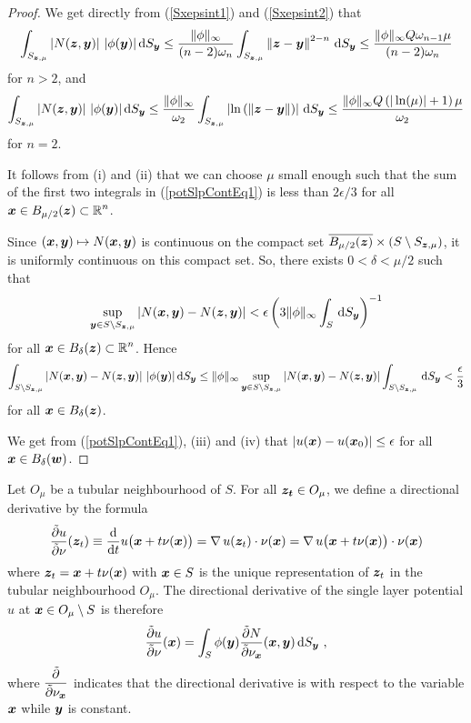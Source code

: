 \begin{proof}
 We get directly from (\ref{Sxepsint1}) and
(\ref{Sxepsint2}) that
\[
\int_{S_{\VEC{z},\mu}} \left| N(\VEC{z},\VEC{y}) \right|\,
|\phi(\VEC{y})| \dss{S}{y}
\leq \frac{\|\phi\|_\infty}{(n-2)\omega_n} 
\int_{S_{\VEC{z},\mu}} \left\|\VEC{z} -\VEC{y} \right\|^{2-n} \dss{S}{y}
\leq \frac{\|\phi\|_\infty Q \omega_{n-1} \mu}{(n-2)\omega_n} 
\]
for $n>2$, and
\[
\int_{S_{\VEC{z},\mu}} \left| N(\VEC{z},\VEC{y}) \right|\,
|\phi(\VEC{y})| \dss{S}{y}
\leq \frac{\|\phi\|_\infty}{\omega_2} 
\int_{S_{\VEC{z},\mu}} \left| \ln\left(
\left\|\VEC{z} -\VEC{y} \right\| \right)\right|  \dss{S}{y}
\leq \frac{ \|\phi\|_\infty Q \left(|\ln(\mu)|+1\right)\mu}{\omega_2} 
\]
for $n= 2$.

  It follows from (i) and (ii) that we can choose $\mu$
small enough such that the sum of the first two integrals
in (\ref{potSlpContEq1}) is less than $2\epsilon/3$ for all
$\DS \VEC{x} \in B_{\mu/2}(\VEC{z}) \subset \RR^n$.

Since $(\VEC{x},\VEC{y}) \mapsto N(\VEC{x},\VEC{y})$ is continuous on
the compact set
$\overline{B_{\mu/2}(\VEC{z})} \times (S \setminus S_{\VEC{z},\mu})$,
it is uniformly continuous on this compact set.  So, there exists
$0 < \delta < \mu/2$ such that
\[
\sup_{\VEC{y} \in S \setminus S_{\VEC{z},\mu}}
\left| N(\VEC{x},\VEC{y}) - N(\VEC{z},\VEC{y}) \right| <
\epsilon\left( 3\|\phi\|_\infty \int_S \dss{S}{y}\right)^{-1}
\]
for all $\DS \VEC{x} \in B_\delta(\VEC{z}) \subset \RR^n$.
Hence
\[
\int_{S \setminus S_{\VEC{z},\mu}}
\left| N(\VEC{x},\VEC{y}) - N(\VEC{z},\VEC{y}) \right|
\,|\phi(\VEC{y}) |\dss{S}{y}
\leq \|\phi\|_\infty \sup_{\VEC{y} \in S \setminus S_{\VEC{z},\mu}}
\left| N(\VEC{x},\VEC{y}) - N(\VEC{z},\VEC{y}) \right| 
\int_{S \setminus S_{\VEC{z},\mu}} \dss{S}{y}
< \frac{\epsilon}{3}
\]
for all $\VEC{x} \in B_\delta(\VEC{z})$.

 We get from (\ref{potSlpContEq1}), (iii) and (iv) that
$\DS \left| u(\VEC{x}) - u(\VEC{x}_0) \right| \leq \epsilon$ for all
$\VEC{x} \in B_\delta(\VEC{w})$.
\end{proof}

Let $O_\mu$ be a tubular neighbourhood of $S$.  For all
$\VEC{z_t} \in O_\mu$, we define a directional derivative by the formula
\[
\pdydxS{u}{\nu}(\VEC{z}_t)
\equiv \dfdx{u\big(\VEC{x}+t\nu(\VEC{x})\big)}{t}
= \graD u(\VEC{z}_t) \cdot \nu(\VEC{x})
= \graD u\big(\VEC{x}+t\nu(\VEC{x})\big) \cdot \nu(\VEC{x})
\]
where $\VEC{z}_t = \VEC{x} + t\nu(\VEC{x})$ with $\VEC{x} \in S$
is the unique representation of $\VEC{z}_t$ in the tubular neighbourhood
$O_\mu$.  The directional derivative of the single layer
potential $u$ at $\VEC{x}\in O_\mu \setminus S$ is
therefore
\[
\pdydxS{u}{\nu}(\VEC{x}) = \int_S 
 \phi(\VEC{y}) \pdydxS{N}{\nu_{\VEC{x}}}(\VEC{x},\VEC{y}) \dss{S}{y} \ ,
\]
where $\DS \pdydxS{}{\nu_{\VEC{x}}}$ indicates that the
directional derivative is with respect to the variable $\VEC{x}$ while
$\VEC{y}$ is constant.

